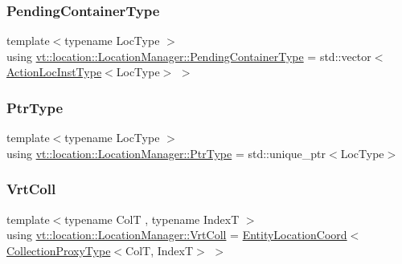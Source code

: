 \mbox{\label{structvt_1_1location_1_1_location_manager_aad005a828c535232cd6b63859b25b171}} 
\subsubsection{\texorpdfstring{Pending\+Container\+Type}{PendingContainerType}}
{\footnotesize\ttfamily template$<$typename Loc\+Type $>$ \\
using \hyperlink{structvt_1_1location_1_1_location_manager_aad005a828c535232cd6b63859b25b171}{vt\+::location\+::\+Location\+Manager\+::\+Pending\+Container\+Type} =  std\+::vector$<$\hyperlink{structvt_1_1location_1_1_location_manager_a6de3841092c537efc5fb8376128bfe18}{Action\+Loc\+Inst\+Type}$<$Loc\+Type$>$ $>$}

\mbox{\label{structvt_1_1location_1_1_location_manager_a32d8bca6ed6909a2190286408335d3b4}} 
\subsubsection{\texorpdfstring{Ptr\+Type}{PtrType}}
{\footnotesize\ttfamily template$<$typename Loc\+Type $>$ \\
using \hyperlink{structvt_1_1location_1_1_location_manager_a32d8bca6ed6909a2190286408335d3b4}{vt\+::location\+::\+Location\+Manager\+::\+Ptr\+Type} =  std\+::unique\+\_\+ptr$<$Loc\+Type$>$}

\mbox{\label{structvt_1_1location_1_1_location_manager_a189fc3b436520c19aada9623a6b4a42e}} 
\subsubsection{\texorpdfstring{Vrt\+Coll}{VrtColl}}
{\footnotesize\ttfamily template$<$typename ColT , typename IndexT $>$ \\
using \hyperlink{structvt_1_1location_1_1_location_manager_a189fc3b436520c19aada9623a6b4a42e}{vt\+::location\+::\+Location\+Manager\+::\+Vrt\+Coll} =  \hyperlink{structvt_1_1location_1_1_entity_location_coord}{Entity\+Location\+Coord}$<$\hyperlink{structvt_1_1location_1_1_location_manager_add8d70c599ff0f03bc7a0d7eaed249d0}{Collection\+Proxy\+Type}$<$ColT, IndexT$>$ $>$}


